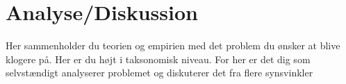 \section{Analyse/Diskussion}
Her sammenholder du teorien og empirien med det problem du ønsker at blive
klogere på. Her er du højt i taksonomisk niveau. For her er det dig som
selvstændigt analyserer problemet og diskuterer det fra flere synsvinkler
